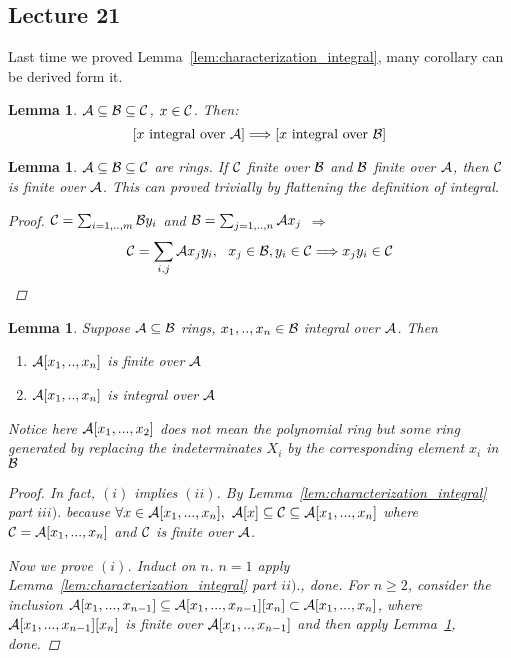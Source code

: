 \documentclass[11pt]{article}
\newtheorem{lemma}[thm]{Lemma}
\newcommand{\cala}{{\cal A}}
\newcommand{\calb}{{\cal B}}
\newcommand{\calc}{{\cal C}}
\newcommand{\Lrta}{\Longrightarrow}
\begin{document}
\subsection{Lecture 21}
Last time we proved Lemma~\ref{lem:characterization_integral}, many corollary can be derived form it.
\begin{lemma}\label{lem:integral_lemma2}
$\cala\subseteq\calb\subseteq \calc$, $x\in\calc$. Then:
$$
[x\text{ integral over }\cala]\Lrta [x\text{ integral over }\calb]
$$
\end{lemma}
\begin{lemma}\label{lem:integral_lemma3}
$\cala\subseteq\calb\subseteq \calc$ are rings. If $\calc$ finite over $\calb$ and $\calb$ finite over $\cala$, then $\calc$ is finite over $\cala$. This can proved trivially by flattening the definition of integral.
\begin{proof}
$\calc=\sum_{i=1,..,m}\calb y_i$ and $\calb=\sum_{j=1,..,n}\cala x_j$ $\Lrta$
$$
\calc=\sum_{i,j}\cala x_j y_i,\ \ x_j\in \calb,y_i\in\calc\Lrta x_j y_i\in \calc
$$
\end{proof}

\end{lemma}

\begin{lemma}\label{lem:integral_lemma4}
Suppose $\cala\subseteq \calb$ rings, $x_1,..,x_n\in\calb$ integral over $\cala$. Then
\begin{enumerate}[label=(\roman*)]
 \item  $\cala[x_1,..,x_n]$ is finite over $\cala$
 \item $\cala[x_1,..,x_n]$ is integral over $\cala$
\end{enumerate}
{\color{red} Notice here $\cala[x_1,...,x_2]$ does not mean the polynomial ring but some ring generated by replacing the indeterminates $X_i$ by the corresponding element $x_i$ in $\calb$}
\begin{proof}
In fact, $(i)$ implies $(ii)$. 
By Lemma~\ref{lem:characterization_integral} part $iii).$ because $\forall x\in\cala[x_1,...,x_n],$ $ \cala[x]\subseteq \calc\subseteq \cala[x_1,...,x_n]$ where $\calc=\cala[x_1,...,x_n]$ and $\calc$ is finite over $\cala$.

Now we prove $(i)$. Induct on $n$. $n=1$ apply Lemma~\ref{lem:characterization_integral} part $ii).$, done. 
For $n\geq 2$, consider the inclusion $\cala[x_1,...,x_{n-1}]\subseteq \cala[x_1,...,x_{n-1}][x_n]\subset\cala[x_1,...,x_n]$, where $\cala[x_1,...,x_{n-1}][x_n]$ is finite over $\cala[x_1,..,x_{n-1}]$ and then apply Lemma~\ref{lem:integral_lemma3}, done.
\end{proof}
\end{lemma}
\end{document}
